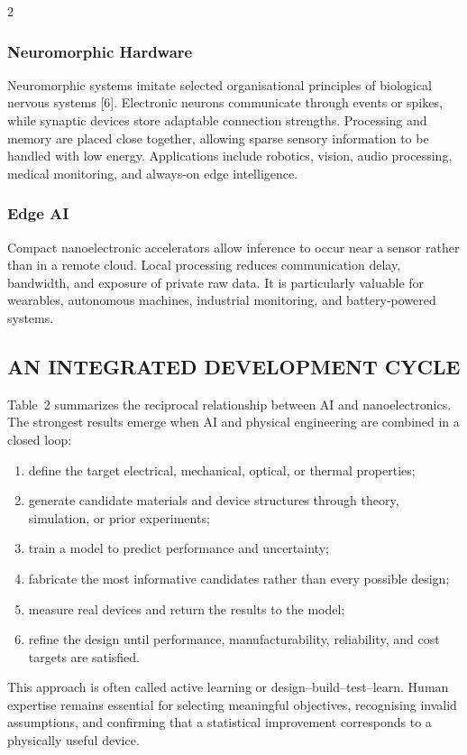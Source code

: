 \begin{multicols}{2}
  \subsubsection*{Neuromorphic Hardware}
  Neuromorphic systems imitate selected organisational principles of biological nervous systems [6]. Electronic neurons communicate through events or spikes, while synaptic devices store adaptable connection strengths. Processing and memory are placed close together, allowing sparse sensory information to be handled with low energy. Applications include robotics, vision, audio processing, medical monitoring, and always-on edge intelligence.

  \subsubsection*{Edge AI}
  Compact nanoelectronic accelerators allow inference to occur near a sensor rather than in a remote cloud. Local processing reduces communication delay, bandwidth, and exposure of private raw data. It is particularly valuable for wearables, autonomous machines, industrial monitoring, and battery-powered systems.

  \subsection*{\centering\uppercase{An Integrated Development Cycle}}
  Table~2 summarizes the reciprocal relationship between AI and nanoelectronics.
  The strongest results emerge when AI and physical engineering are combined in a closed loop:
  \begin{enumerate}\justifying
    \item define the target electrical, mechanical, optical, or thermal properties;
    \item generate candidate materials and device structures through theory, simulation, or prior experiments;
    \item train a model to predict performance and uncertainty;
    \item fabricate the most informative candidates rather than every possible design;
    \item measure real devices and return the results to the model;
    \item refine the design until performance, manufacturability, reliability, and cost targets are satisfied.
  \end{enumerate}
  This approach is often called active learning or design--build--test--learn. Human expertise remains essential for selecting meaningful objectives, recognising invalid assumptions, and confirming that a statistical improvement corresponds to a physically useful device.


\end{multicols}
